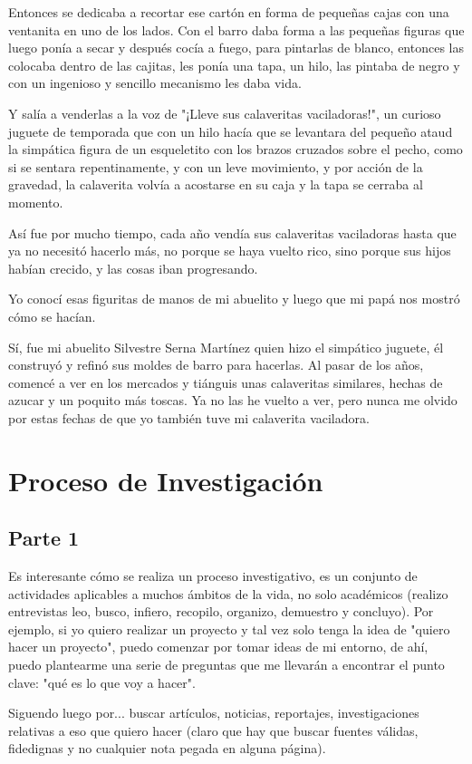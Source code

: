 Entonces se dedicaba a recortar ese cartón en forma de pequeñas cajas con una ventanita en uno de los lados. Con el barro daba forma a las pequeñas figuras que luego ponía a secar y después cocía a fuego, para pintarlas de blanco, entonces las colocaba dentro de las cajitas, les ponía una tapa, un hilo, las pintaba de negro y con un ingenioso y sencillo mecanismo les daba vida.

Y salía a venderlas a la voz de "¡Lleve sus calaveritas vaciladoras!", un curioso juguete de temporada que con un hilo hacía que se levantara del pequeño ataud la simpática figura de un esqueletito con los brazos cruzados sobre el pecho, como si se sentara repentinamente, y con un leve movimiento, y por acción de la gravedad, la calaverita volvía a acostarse en su caja y la tapa se cerraba al momento.

Así fue por mucho tiempo, cada año vendía sus calaveritas vaciladoras hasta que ya no necesitó hacerlo más, no porque se haya vuelto rico, sino porque sus hijos habían crecido, y las cosas iban progresando.

Yo conocí esas figuritas de manos de mi abuelito y luego que mi papá nos mostró cómo se hacían.

Sí, fue mi abuelito Silvestre Serna Martínez quien hizo el simpático juguete, él construyó y refinó sus moldes de barro para hacerlas. Al pasar de los años, comencé a ver en los mercados y tiánguis unas calaveritas similares, hechas de azucar y un poquito más toscas. Ya no las he vuelto a ver, pero nunca me olvido por estas fechas de que yo también tuve mi calaverita vaciladora.

\chapter{Proceso de Investigación}
\section{Parte 1}
Es interesante cómo se realiza un proceso investigativo, es un conjunto de actividades aplicables a muchos ámbitos de la vida, no solo académicos (realizo entrevistas leo, busco, infiero, recopilo, organizo, demuestro y concluyo). Por ejemplo, si yo quiero realizar un proyecto y tal vez solo tenga la idea de "quiero hacer un proyecto", puedo comenzar por tomar ideas de mi entorno, de ahí, puedo plantearme una serie de preguntas que me llevarán a encontrar el punto clave: "qué es lo que voy a hacer".

Siguendo luego por... buscar artículos, noticias, reportajes, investigaciones relativas a eso que quiero hacer (claro que hay que buscar fuentes válidas, fidedignas y no cualquier nota pegada en alguna página).

